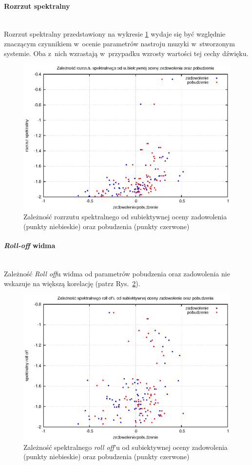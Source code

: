 \paragraph{Rozrzut spektralny}\mbox{}\\
Rozrzut spektralny przedstawiony na wykresie \ref{wykresSpread} wydaje się być względnie znaczącym czynnikiem w~ocenie parametrów nastroju muzyki w~stworzonym systemie. Oba z~nich wzrastają w~przypadku wzrosty wartości tej cechy dźwięku.
\begin{figure}[ht!]
\centering
\includegraphics[scale=\imageSize]{res/spread.eps}
\caption{Zależność rozrzutu spektralnego od subiektywnej oceny zadowolenia (punkty niebieskie) oraz pobudzenia (punkty czerwone)\label{wykresSpread}}
\end{figure}
\paragraph{\emph{Roll-off} widma}\mbox{}\\
Zależność \emph{Roll off}u widma od parametrów pobudzenia oraz zadowolenia nie wskazuje na większą korelację (patrz Rys.~\ref{wykresRollOff}).
\begin{figure}[ht!]
\centering
\includegraphics[scale=\imageSize]{res/rollOff.eps}
\caption{Zależność spektralnego \emph{roll off}'u od subiektywnej oceny zadowolenia (punkty niebieskie) oraz pobudzenia (punkty czerwone)\label{wykresRollOff}}
\end{figure}
